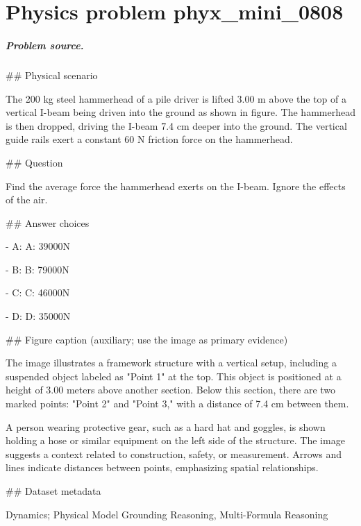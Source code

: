 
\chapter{Physics problem phyx\_mini\_0808}
\label{ch:PhyXMiniProblems_problem_phyx_mini_0808}

\paragraph{Problem source.}
\#\# Physical scenario

The 200 kg steel hammerhead of a pile driver is lifted 3.00 m above the top of a vertical I-beam being driven into the ground as shown in figure. The hammerhead is then dropped, driving the I-beam 7.4 cm deeper into the ground. The vertical guide rails exert a constant 60 N friction force on the hammerhead.

\#\# Question

Find the average force the hammerhead exerts on the I-beam. Ignore the effects of the air.

\#\# Answer choices

- A: A: 39000N

- B: B: 79000N

- C: C: 46000N

- D: D: 35000N

\#\# Figure caption (auxiliary; use the image as primary evidence)

The image illustrates a framework structure with a vertical setup, including a suspended object labeled as "Point 1" at the top. This object is positioned at a height of 3.00 meters above another section. Below this section, there are two marked points: "Point 2" and "Point 3," with a distance of 7.4 cm between them.

A person wearing protective gear, such as a hard hat and goggles, is shown holding a hose or similar equipment on the left side of the structure. The image suggests a context related to construction, safety, or measurement. Arrows and lines indicate distances between points, emphasizing spatial relationships.

\#\# Dataset metadata

Dynamics; Physical Model Grounding Reasoning, Multi-Formula Reasoning

